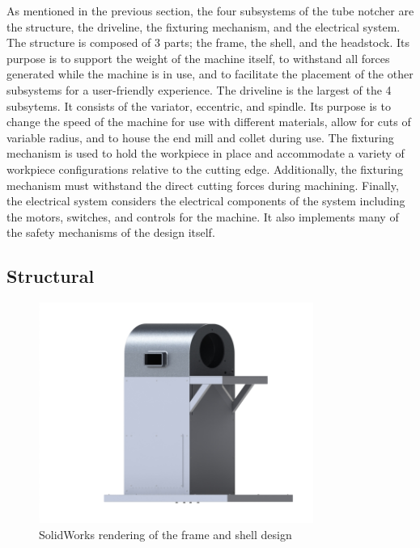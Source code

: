 As mentioned in the previous section, the four subsystems of the tube notcher are the structure, the driveline, the fixturing mechanism, and the electrical system. The structure is composed of 3 parts; the frame, the shell, and the headstock. Its purpose is to support the weight of the machine itself, to withstand all forces generated while the machine is in use, and to facilitate the placement of the other subsystems for a user-friendly experience. The driveline is the largest of the 4 subsytems. It consists of the variator, eccentric, and spindle. Its purpose is to change the speed of the machine for use with different materials, allow for cuts of variable radius, and to house the end mill and collet during use. The fixturing mechanism is used to hold the workpiece in place and accommodate a variety of workpiece configurations relative to the cutting edge. Additionally, the fixturing mechanism must withstand the direct cutting forces during machining. Finally, the electrical system considers the electrical components of the system including the motors, switches, and controls for the machine. It also implements many of the safety mechanisms of the design itself. 

\newpage
\subsection{Structural}

\begin{figure}[H]
    \centering
    \includegraphics[width=0.8\textwidth]{./fall-report pictures/Chapter2-MachineDescription/Structural}
    \caption{SolidWorks rendering of the frame and shell design}
    \label{fig:Frame and Shell}
\end{figure}

